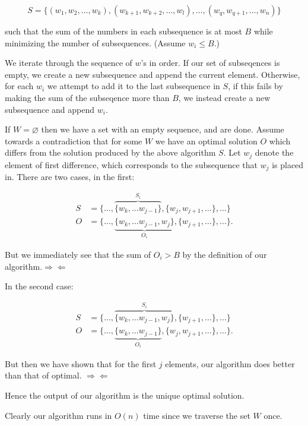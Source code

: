 \documentclass{amsart}
\theoremstyle{definition}
\theoremstyle{remark}
\numberwithin{equation}{section}
\let\null\varnothing
\begin{document}
$$ S = \{ (w_1,w_2,\ldots,w_k), (w_{k+1},w_{k+2},\ldots,w_l),\ldots,(w_q,w_{q+1},\ldots,w_n) \} $$

such that the sum of the numbers in each subsequence is at most $B$ while
minimizing the number of subsequences. (Assume $w_i \leq B$.)

\algstar We iterate through the sequence of $w$'s in order. If our set
of subseqences is empty, we create a new subsequence and append the
current element. Otherwise, for each $w_i$ we attempt to add it to
the last subsequence in $S$, if this fails by making the sum of the
subseqence more than $B$, we instead create a new subsequence and append
$w_i$.

\proof If $W = \null$ then we have a set with an empty sequence, and
are done. Assume towards a contradiction that for some $W$ we have an
optimal solution $O$ which differs from the solution produced by the
above algorithm $S$. Let $w_j$ denote the element of first difference,
which corresponds to the subsequence that $w_j$ is placed in. There are
two cases, in the first:

\begin{align*}
  S &= \{ \ldots, \overbrace{\{w_k, \ldots  w_{j-1}\} }^{S_i}, \{w_j, w_{j+1},\ldots \}, \ldots \} \\
  O &= \{ \ldots, \underbrace{\{w_k, \ldots w_{j-1}, w_j \}}_{O_i}, \{w_{j+1},\ldots \}, \ldots \}.
\end{align*}

But we immediately see that the sum of $O_i > B$ by the definition of our
algorithm.$\Rightarrow \Leftarrow$

In the second case:

\begin{align*}
  S &= \{ \ldots, \overbrace{\{w_k, \ldots  w_{j-1}, w_j \} }^{S_i}, \{w_{j+1},\ldots \}, \ldots \} \\
  O &= \{ \ldots, \underbrace{\{w_k, \ldots w_{j-1} \}}_{O_i}, \{ w_j, w_{j+1},\ldots \}, \ldots \}.
\end{align*}

But then we have shown that for the first $j$ elements, our algorithm does better than
that of optimal. $\Rightarrow \Leftarrow$

Hence the output of our algorithm is the unique optimal solution.

\rmkstar Clearly our algorithm runs in $O(n)$ time since we traverse the
set $W$ once.

\section{}
\end{document}
